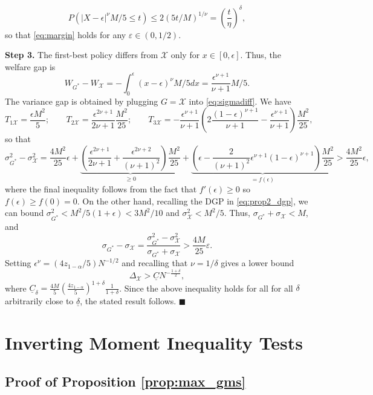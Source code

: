 \documentclass[12pt]{article}
\numberwithin{equation}{section}
\theoremstyle{plain}                         %
\theoremstyle{definition}                  %
\theoremstyle{remark}                      %
\renewcommand{\qed}{\hfill$\blacksquare$}
\begin{document}
\[
P(|X - \epsilon|^{\nu}M/5 \leq t) \leq 2(5t/M)^{1/\nu} =  \left(\frac{t}{\eta}\right)^{\delta},
\]
so that \eqref{eq:margin} holds for any $\varepsilon \in (0, 1/2)$.  \medskip 


\textbf{Step 3.} The first-best policy differs from $\mathcal{X}$ only for $x \in [0, \epsilon]$. Thus, the welfare gap is 
$$
W_{G^{*}} -W_{\mathcal{X}} = -\int_0^{\epsilon} (x-\epsilon)^{\nu}M/5 dx  = \frac{\epsilon^{\nu+1}}{\nu+1}M/5.
$$ 
The variance gap is obtained by plugging $G=\mathcal{X}$ into \eqref{eq:sigmadiff}. We have
\[
	T_{1\mathcal{X}} =  \frac{ \epsilon M^2}{5}; \;\;\;\;\;\;\; 	T_{2 \mathcal{X}} = \dfrac{\epsilon^{2\nu+1}}{2\nu+1} \frac{M^2}{25}; \;\;\;\;\;\;\; T_{3 \mathcal{X}} = - \dfrac{\epsilon^{\nu + 1}}{\nu + 1} \left( 2\dfrac{(1-\epsilon)^{\nu + 1}}{\nu + 1} - \dfrac{\epsilon^{\nu + 1}}{\nu + 1} \right)\frac{M^2}{25},
\]
so that
$$
\sigma^2_{G^{*}} -\sigma^2_{\mathcal{X}} = \frac{4M^2}{25}\epsilon + \underbrace{\left(\frac{\epsilon^{2\nu + 1}}{2\nu + 1} + \frac{\epsilon^{2\nu + 2}}{(\nu + 1)^2}\right) \frac{M^2}{25}}_{\geq 0}  + \underbrace{\left(\epsilon - \frac{2}{(\nu+1)^2} \epsilon^{\nu + 1}(1-\epsilon)^{\nu + 1}\right)\frac{M^2}{25}}_{=f(\epsilon)} > \frac{4M^2}{25}\epsilon,
$$
where the final inequality follows from the fact that $f'(\epsilon) \geq 0$ so $f(\epsilon)\geq f(0) = 0 $. On the other hand, recalling the DGP in \eqref{eq:prop2_dgp}, we can bound $\sigma^2_{G^*} < M^2/5(1 + \epsilon) < 3 M^2/10$ and $\sigma^2_{\mathcal{X}} < M^2/5$. Thus, $\sigma_{G^*} + \sigma_{\mathcal{X}} < M$, and
$$
\sigma_{G^{*}} -\sigma_{\mathcal{X}} = \frac{\sigma^2_{G^*} - \sigma^2_{\mathcal{X}}}{\sigma_{G^*} + \sigma_{\mathcal{X}}} >  \frac{4M}{25}\varepsilon.
$$
Setting $\epsilon^{\nu} = (4z_{1-\alpha}/5) N^{-1/2}$ and recalling that $\nu = 1/\delta$ gives a lower bound 
\[
\Delta_{\mathcal{X}}  > \underline{C} N^{-\frac{1 + \delta}{2}},
\]
where $\underline{C}_{\delta} = \frac{4 M}{5} \left( \frac{4z_{1-\alpha}}{5}\right)^{1+\delta} \frac{1}{1 + \delta}$. Since the above inequality holds for all for all $\delta$ arbitrarily close to $\underline{\delta}$, the stated result follows. 
 \qed 




\section{Inverting Moment Inequality Tests}
\label{app:shb}



\subsection{Proof of Proposition \ref{prop:max_gms} }
\end{document}
